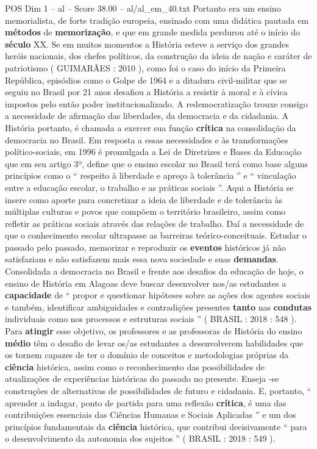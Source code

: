 \begin{textsample}{POS Dim 1 – al – Score 38.00 – al/al\_em\_40.txt}
Portanto era um ensino memorialista, de forte tradição europeia, ensinado com uma didática pautada em \textbf{métodos} de \textbf{memorização}, e que em grande medida perdurou até o início do \textbf{século} XX.
Se em muitos momentos a História esteve a serviço dos grandes heróis nacionais, dos chefes políticos, da construção da ideia de nação e caráter de patriotismo ( GUIMARÃES : 2010 ), como foi o caso do início da Primeira República, episódios como o Golpe de 1964 e a ditadura civil-militar que se seguiu no Brasil por 21 anos desafiou a História a resistir à moral e à cívica impostos pelo então poder institucionalizado.
A redemocratização trouxe consigo a necessidade de afirmação das liberdades, da democracia e da cidadania.
A História portanto, é chamada a exercer sua função \textbf{crítica} na consolidação da democracia no Brasil.
Em resposta a essas necessidades e às transformações político-sociais, em 1996 é promulgada a Lei de Diretrizes e Bases da Educação que em seu artigo 3º, define que o ensino escolar no Brasil terá como base alguns princípios como o “ respeito à liberdade e apreço à tolerância ” e “ vinculação entre a educação escolar, o trabalho e as práticas sociais ”.
Aqui a História se insere como aporte para concretizar a ideia de liberdade e de tolerância às múltiplas culturas e povos que compõem o território brasileiro, assim como refletir as práticas sociais através das relações de trabalho.
Daí a necessidade de que o conhecimento escolar ultrapasse as barreiras teórico-conceituais.
Estudar o passado pelo passado, memorizar e reproduzir os \textbf{eventos} históricos já não satisfaziam e não satisfazem mais essa nova sociedade e suas \textbf{demandas}.
Consolidada a democracia no Brasil e frente aos desafios da educação de hoje, o ensino de História em Alagoas deve buscar desenvolver nos/as estudantes a \textbf{capacidade} de “ propor e questionar hipóteses sobre as ações dos agentes sociais e também, identificar ambiguidades e contradições presentes \textbf{tanto} nas \textbf{condutas} individuais como nos processos e estruturas sociais ” ( BRASIL : 2018 : 548 ).
Para \textbf{atingir} esse objetivo, os professores e as professoras de História do ensino \textbf{médio} têm o desafio de levar os/as estudantes a desenvolverem habilidades que os tornem capazes de ter o domínio de conceitos e metodologias próprias da \textbf{ciência} histórica, assim como o reconhecimento das possibilidades de atualizações de experiências históricas do passado no presente.
Enseja -se construções de alternativas de possibilidades de futuro e cidadania.
E, portanto, “ aprender a indagar, ponto de partida para uma reflexão \textbf{crítica}, é uma das contribuições essenciais das Ciências Humanas e Sociais Aplicadas ” e um dos princípios fundamentais da \textbf{ciência} histórica, que contribui decisivamente “ para o desenvolvimento da autonomia dos sujeitos ” ( BRASIL : 2018 : 549 ).

\end{textsample}
